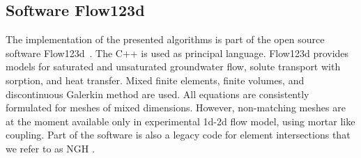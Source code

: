 \documentclass{elsarticle}
\newcommand{\noteJB}[1]{{\color{Blue} \textbf{JB: } \textit{#1}}}
\newcommand{\notePE}[1]{{\color{Orange} \textbf{PE: } \textit{#1}}}
\newcommand{\ngh}{NGH }
\begin{document}
\subsection{Software Flow123d}
The implementation of the presented algorithms is part of the open source software Flow123d~\cite{flow123d}.
The C++ is used as principal language. Flow123d provides models for saturated and unsaturated groundwater flow,
solute transport with sorption, and  heat transfer. Mixed finite elements, finite volumes, and discontinuous Galerkin method are 
used. All equations are consistently formulated for meshes of mixed dimensions.  However,
non-matching meshes are at the moment available only in experimental 1d-2d flow model, using mortar like coupling.
Part of the software is also a legacy code for element intersections that we refer to as \ngh.


\end{document}

